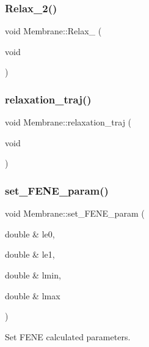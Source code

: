 \mbox{\label{classMembrane_ad9b20c6a4e11da731a7981e47b7e35c5}} 
\subsubsection{\texorpdfstring{Relax\_2()}{Relax\_2()}}
{\footnotesize\ttfamily void Membrane\+::\+Relax\+\_ (\begin{DoxyParamCaption}\item[{void}]{ }\end{DoxyParamCaption})}

\mbox{\label{classMembrane_aa4286fd20ae452585ec5d19c67268eed}} 
\subsubsection{\texorpdfstring{relaxation\_traj()}{relaxation\_traj()}}
{\footnotesize\ttfamily void Membrane\+::relaxation\+\_\+traj (\begin{DoxyParamCaption}\item[{void}]{ }\end{DoxyParamCaption})}

\mbox{\label{classMembrane_ae240d9a481d914b7e5092bb9183aa0fa}} 
\subsubsection{\texorpdfstring{set\_FENE\_param()}{set\_FENE\_param()}}
{\footnotesize\ttfamily void Membrane\+::set\+\_\+\+F\+E\+N\+E\+\_\+param (\begin{DoxyParamCaption}\item[{double \&}]{le0,  }\item[{double \&}]{le1,  }\item[{double \&}]{lmin,  }\item[{double \&}]{lmax }\end{DoxyParamCaption})\hspace{0.3cm}{\ttfamily [inline]}}

Set F\+E\+NE calculated parameters. \mbox{\label{classMembrane_a6b74827fd9dc653001b7cd6315b065a2}} 
